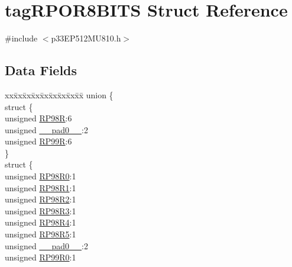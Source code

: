 \hypertarget{structtag_r_p_o_r8_b_i_t_s}{}\section{tag\+R\+P\+O\+R8\+B\+I\+TS Struct Reference}
\label{structtag_r_p_o_r8_b_i_t_s}


{\ttfamily \#include $<$p33\+E\+P512\+M\+U810.\+h$>$}

\subsection*{Data Fields}
\begin{DoxyCompactItemize}
\item 
\begin{tabbing}
xx\=xx\=xx\=xx\=xx\=xx\=xx\=xx\=xx\=\kill
union \{\\
\>struct \{\\
\>\>unsigned \hyperlink{structtag_r_p_o_r8_b_i_t_s_a603505a017a3cc7245bb1ce1a479e774}{RP98R}:6\\
\>\>unsigned \hyperlink{structtag_r_p_o_r8_b_i_t_s_adf71f3d8410c1f1dbbc96680a92c49af}{\_\_pad0\_\_}:2\\
\>\>unsigned \hyperlink{structtag_r_p_o_r8_b_i_t_s_a0f1d3e84d67a3d0ee879856e6fd46089}{RP99R}:6\\
\>\} \\
\>struct \{\\
\>\>unsigned \hyperlink{structtag_r_p_o_r8_b_i_t_s_ade3dd90165b77f548a164f7e9de4096f}{RP98R0}:1\\
\>\>unsigned \hyperlink{structtag_r_p_o_r8_b_i_t_s_a9c9d14b762507f4f741d2cf061592a14}{RP98R1}:1\\
\>\>unsigned \hyperlink{structtag_r_p_o_r8_b_i_t_s_ab5b33a460d307b12d00ff44cd7c25c38}{RP98R2}:1\\
\>\>unsigned \hyperlink{structtag_r_p_o_r8_b_i_t_s_a115e6c989d542115db8c465e1b660a22}{RP98R3}:1\\
\>\>unsigned \hyperlink{structtag_r_p_o_r8_b_i_t_s_a1a0d82b6edafd40ac34eae7a4261dbf9}{RP98R4}:1\\
\>\>unsigned \hyperlink{structtag_r_p_o_r8_b_i_t_s_a05d55428dec1b99f0bff4a9c76101822}{RP98R5}:1\\
\>\>unsigned \hyperlink{structtag_r_p_o_r8_b_i_t_s_adf71f3d8410c1f1dbbc96680a92c49af}{\_\_pad0\_\_}:2\\
\>\>unsigned \hyperlink{structtag_r_p_o_r8_b_i_t_s_ab47e4ea5974708daa028e69d1158772c}{RP99R0}:1\\

\end{tabbing}
\end{DoxyCompactItemize}
